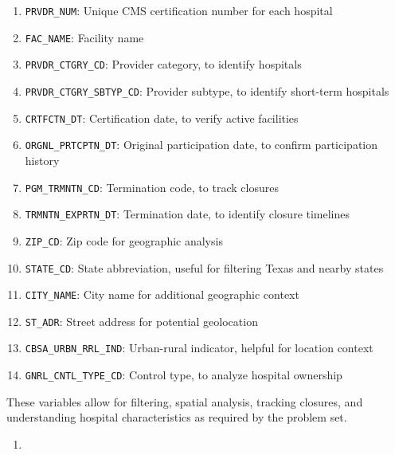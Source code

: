 \documentclass[
  letterpaper,
  DIV=11,
  numbers=noendperiod]{scrartcl}
\providecommand{\tightlist}{%
  \setlength{\itemsep}{0pt}\setlength{\parskip}{0pt}}\usepackage{longtable,booktabs,array}
\begin{document}
\begin{enumerate}
  \begin{enumerate}
  \def\labelenumii{\roman{enumii}.}
  \tightlist
  \item
    \texttt{PRVDR\_NUM}: Unique CMS certification number for each
    hospital
  \item
    \texttt{FAC\_NAME}: Facility name
  \item
    \texttt{PRVDR\_CTGRY\_CD}: Provider category, to identify hospitals
  \item
    \texttt{PRVDR\_CTGRY\_SBTYP\_CD}: Provider subtype, to identify
    short-term hospitals
  \item
    \texttt{CRTFCTN\_DT}: Certification date, to verify active
    facilities
  \item
    \texttt{ORGNL\_PRTCPTN\_DT}: Original participation date, to confirm
    participation history
  \item
    \texttt{PGM\_TRMNTN\_CD}: Termination code, to track closures
  \item
    \texttt{TRMNTN\_EXPRTN\_DT}: Termination date, to identify closure
    timelines
  \item
    \texttt{ZIP\_CD}: Zip code for geographic analysis
  \item
    \texttt{STATE\_CD}: State abbreviation, useful for filtering Texas
    and nearby states
  \item
    \texttt{CITY\_NAME}: City name for additional geographic context
  \item
    \texttt{ST\_ADR}: Street address for potential geolocation
  \item
    \texttt{CBSA\_URBN\_RRL\_IND}: Urban-rural indicator, helpful for
    location context
  \item
    \texttt{GNRL\_CNTL\_TYPE\_CD}: Control type, to analyze hospital
    ownership
  \end{enumerate}
\end{enumerate}

These variables allow for filtering, spatial analysis, tracking
closures, and understanding hospital characteristics as required by the
problem set.

\begin{enumerate}
\def\labelenumi{\arabic{enumi}.}
\setcounter{enumi}{1}
\tightlist
\item
\end{enumerate}
\end{document}
